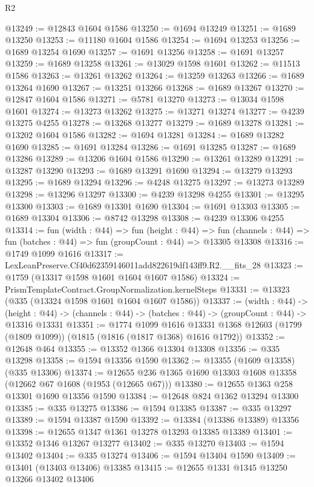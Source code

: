 \begin{lexlean}{R2}
\begin{coremodule}
@13249 := @12843 @1604 @1586
@13250 := @1694 @13249
@13251 := @1689 @13250
@13253 := @11180 @1604 @1586
@13254 := @1694 @13253
@13256 := @1689 @13254 @1690
@13257 := @1691 @13256
@13258 := @1691 @13257
@13259 := @1689 @13258
@13261 := @13029 @1598 @1601
@13262 := @11513 @1586
@13263 := @13261 @13262
@13264 := @13259 @13263
@13266 := @1689 @13264 @1690
@13267 := @13251 @13266
@13268 := @1689 @13267
@13270 := @12847 @1604 @1586
@13271 := @5781 @13270
@13273 := @13034 @1598 @1601
@13274 := @13273 @13262
@13275 := @13271 @13274
@13277 := @4239 @13275 @4255
@13278 := @13268 @13277
@13279 := @1689 @13278
@13281 := @13202 @1604 @1586
@13282 := @1694 @13281
@13284 := @1689 @13282 @1690
@13285 := @1691 @13284
@13286 := @1691 @13285
@13287 := @1689 @13286
@13289 := @13206 @1604 @1586
@13290 := @13261 @13289
@13291 := @13287 @13290
@13293 := @1689 @13291 @1690
@13294 := @13279 @13293
@13295 := @1689 @13294
@13296 := @4248 @13275
@13297 := @13273 @13289
@13298 := @13296 @13297
@13300 := @4239 @13298 @4255
@13301 := @13295 @13300
@13303 := @1689 @13301 @1690
@13304 := @1691 @13303
@13305 := @1689 @13304
@13306 := @8742 @13298
@13308 := @4239 @13306 @4255
@13314 := fun (width : @44) =>
  fun (height : @44) =>
  fun (channels : @44) => fun (batches : @44) => fun (groupCount : @44) => @13305 @13308
@13316 := @1749 @1099 @1616
@13317 := LexLeanPreserve.Cf40d62359146011add822619df143ff9.R2.__fits_28
@13323 := @1759 (@13317 @1598 @1601 @1604 @1607 @1586)
@13324 := PrismTemplateContract.GroupNormalization.kernelSteps
@13331 := @13323 (@335 (@13324 @1598 @1601 @1604 @1607 @1586))
@13337 := (width : @44) ->
  (height : @44) -> (channels : @44) -> (batches : @44) -> (groupCount : @44) -> @13316 @13331
@13351 := @1774
    @1099
    @1616
    @13331
    @1368
    @12603
    (@1799 (@1809 @1099))
    (@1815 (@1816 (@1817 @1368) @1616 @1792))
@13352 := @12648 @464
@13355 := @13352 @1366 @13304 @13308
@13356 := @335 @13298
@13358 := @1594 @13356 @1590
@13362 := @13355 (@1609 @13358) (@335 @13306)
@13374 := @12655 @236 @1365 @1690 @13303 @1608 @13358 (@12662 @67 @1608 (@1953 (@12665 @67)))
@13380 := @12655 @1363 @258 @13301 @1690 @13356 @1590
@13384 := @12648 @824 @1362 @13294 @13300
@13385 := @335 @13275
@13386 := @1594 @13385
@13387 := @335 @13297
@13389 := @1594 @13387 @1590
@13392 := @13384 (@13386 @13389) @13356
@13398 := @12655 @1347 @1361 @13278 @13293 @13385 @13389
@13401 := @13352 @1346 @13267 @13277
@13402 := @335 @13270
@13403 := @1594 @13402
@13404 := @335 @13274
@13406 := @1594 @13404 @1590
@13409 := @13401 (@13403 @13406) @13385
@13415 := @12655 @1331 @1345 @13250 @13266 @13402 @13406

\end{coremodule}
\end{lexlean}
